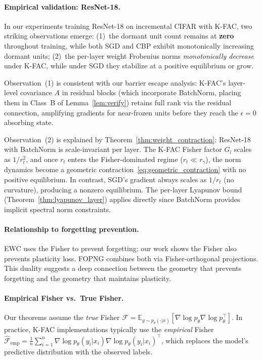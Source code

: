 \documentclass{article}
\providecommand{\E}{\mathbb{E}}
\providecommand{\FIM}{\mathcal{F}}
\theoremstyle{plain}
\theoremstyle{definition}
\theoremstyle{remark}
\begin{document}
\paragraph{Empirical validation: ResNet-18.}
In our experiments training ResNet-18 on incremental CIFAR with K-FAC, two striking observations emerge: (1)~the dormant unit count remains at \textbf{zero} throughout training, while both SGD and CBP \citep{dohare2024loss} exhibit monotonically increasing dormant units; (2)~the per-layer weight Frobenius norms \emph{monotonically decrease} under K-FAC, while under SGD they stabilize at a positive equilibrium or grow.

Observation~(1) is consistent with our barrier escape analysis: K-FAC's layer-level covariance $A$ in residual blocks (which incorporate BatchNorm, placing them in Class~B of Lemma~\ref{lem:verify}) retains full rank via the residual connection, amplifying gradients for near-frozen units before they reach the $\epsilon = 0$ absorbing state.

Observation~(2) is explained by Theorem~\ref{thm:weight_contraction}: ResNet-18 with BatchNorm is scale-invariant per layer. The K-FAC Fisher factor $G_l$ scales as $1/r_t^2$, and once $r_t$ enters the Fisher-dominated regime ($r_t \ll r_\gamma$), the norm dynamics become a geometric contraction~\eqref{eq:geometric_contraction} with no positive equilibrium. In contrast, SGD's gradient always scales as $1/r_t$ (no curvature), producing a nonzero equilibrium. The per-layer Lyapunov bound (Theorem~\ref{thm:lyapunov_layer}) applies directly since BatchNorm provides implicit spectral norm constraints.

\paragraph{Relationship to forgetting prevention.}
EWC \citep{kirkpatrick2017ewc} uses the Fisher to prevent forgetting; our work shows the Fisher also prevents plasticity loss. FOPNG \citep{garg2025fopng} combines both via Fisher-orthogonal projections. This duality suggests a deep connection between the geometry that prevents forgetting and the geometry that maintains plasticity.

\paragraph{Empirical Fisher vs.\ True Fisher.}
\label{par:emp_fisher}
Our theorems assume the \emph{true} Fisher $\FIM = \E_{y \sim p_\theta(\cdot|x)}[\nabla\log p_\theta \nabla\log p_\theta^\top]$. In practice, K-FAC implementations typically use the \emph{empirical} Fisher $\hat{\FIM}_{\mathrm{emp}} = \frac{1}{n}\sum_{i=1}^n \nabla\log p_\theta(y_i|x_i)\nabla\log p_\theta(y_i|x_i)^\top$, which replaces the model's predictive distribution with the observed labels.
\end{document}
